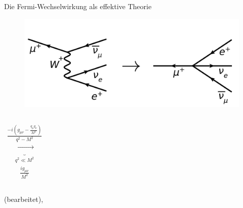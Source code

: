 \documentclass[aspectratio=1610, professionalfonts, 10pt]{beamer}
\begin{document}
\begin{frame}{Die Fermi-Wechselwirkung als effektive Theorie}
	\begin{figure}
	  	\centering
		\includegraphics[width=0.8\linewidth]{Images/muon_decay.png}
	  	\label{fig:fermi_2}
	\end{figure}	
		\vspace*{-10px}
	\begin{columns}
				{\Large
				\begin{align*}
					\frac{-i \left( g_{\mu\nu} - \frac{q_\mu q_\nu}{M^2} \right)}{q^2 - M^2}
				\end{align*}
				}%
				{\LARGE
				\begin{align*}
					\underbrace{\rightarrow}_{q^2 \ll M^2}
				\end{align*}
				}%
				{\Large
				\begin{align*}
					\frac{i g_{\mu\nu}}{M^2}
				\end{align*}
				}%
	\end{columns}
	\vspace*{15px}
	\cite{Gorringe:2015cma} (bearbeitet), \cite{Griffiths:111880}
\end{frame}
\end{document}
